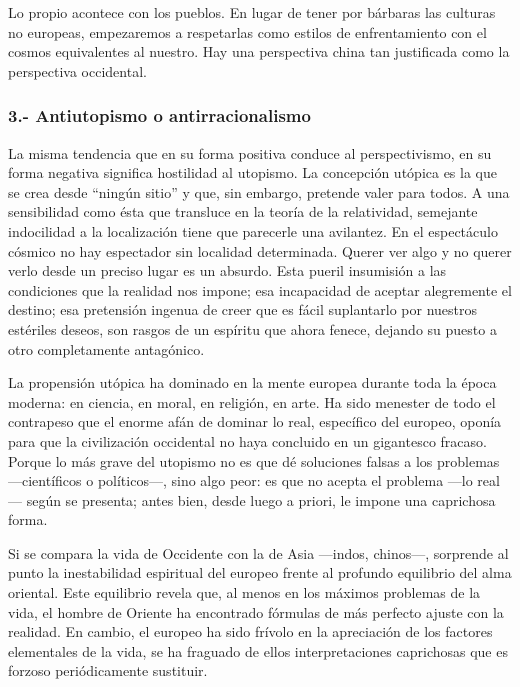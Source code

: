 \documentclass[a4paper, 12pt]{article}
\begin{document}
Lo propio acontece con los pueblos. En lugar de tener por bárbaras las
culturas no europeas, empezaremos a respetarlas como estilos de
enfrentamiento con el cosmos equivalentes al nuestro. Hay una perspectiva
china tan justificada como la perspectiva occidental.

\subsubsection*{3.- Antiutopismo o antirracionalismo}

La misma tendencia que en su forma positiva conduce al perspectivismo, en
su forma negativa significa hostilidad al utopismo.
La concepción utópica es la que se crea desde ``ningún sitio''  y que, sin
embargo, pretende valer para todos. A una sensibilidad como ésta que
transluce en la teoría de la relatividad, semejante indocilidad a la
localización tiene que parecerle una avilantez. En el espectáculo cósmico
no hay espectador sin localidad determinada. Querer ver algo y no querer
verlo desde un preciso lugar es un absurdo. Esta pueril insumisión a las
condiciones que la realidad nos impone; esa incapacidad de aceptar
alegremente el destino; esa pretensión ingenua de creer que es fácil
suplantarlo por nuestros estériles deseos, son rasgos de un espíritu que
ahora fenece, dejando su puesto a otro completamente antagónico.

La propensión utópica ha dominado en la mente europea durante toda la
época moderna: en ciencia, en moral, en religión, en arte. Ha sido
menester de todo el contrapeso que el enorme afán de dominar lo real,
específico del europeo, oponía para que la civilización occidental no haya
concluido en un gigantesco fracaso. Porque lo más grave del utopismo no es
que dé soluciones falsas a los problemas ---científicos o políticos---, sino
algo peor: es que no acepta el problema ---lo real--- según se presenta; antes
bien, desde luego a priori, le impone una caprichosa forma.

Si se compara la vida de Occidente con la de Asia ---indos, chinos---,
sorprende al punto la inestabilidad espiritual del europeo frente al
profundo equilibrio del alma oriental. Este equilibrio revela que, al
menos en los máximos problemas de la vida, el hombre de Oriente ha
encontrado fórmulas de más perfecto ajuste con la realidad. En cambio, el
europeo ha sido frívolo en la apreciación de los factores elementales de
la vida, se ha fraguado de ellos interpretaciones caprichosas que es
forzoso periódicamente sustituir.
\end{document}
